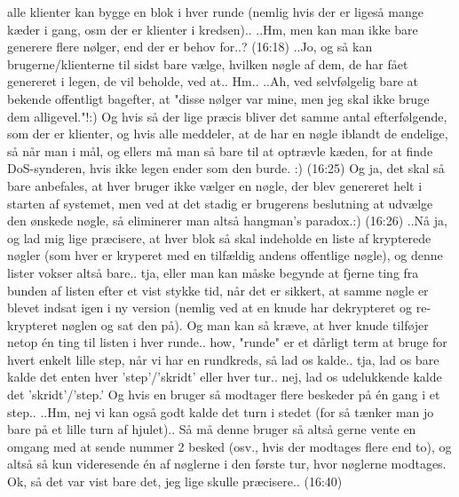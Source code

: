 \documentclass{report}
\begin{document}
alle klienter kan bygge en blok i hver runde (nemlig hvis der er ligeså mange kæder i gang, osm der er klienter i kredsen).. ..Hm, men kan man ikke bare generere flere nølger, end der er behov for..? (16:18) ..Jo, og så kan brugerne/klienterne til sidst bare vælge, hvilken nøgle af dem, de har fået genereret i legen, de vil beholde, ved at.. Hm.. ..Ah, ved selvfølgelig bare at bekende offentligt bagefter, at "disse nølger var mine, men jeg skal ikke bruge dem alligevel."!:) Og hvis så der lige præcis bliver det samme antal efterfølgende, som der er klienter, og hvis alle meddeler, at de har en nøgle iblandt de endelige, så når man i mål, og ellers må man så bare til at optrævle kæden, for at finde DoS-synderen, hvis ikke legen ender som den burde. :) (16:25) Og ja, det skal så bare anbefales, at hver bruger ikke vælger en nøgle, der blev genereret helt i starten af systemet, men ved at det stadig er brugerens beslutning at udvælge den ønskede nøgle, så eliminerer man altså hangman's paradox.:) (16:26) ..Nå ja, og lad mig lige præcisere, at hver blok så skal indeholde en liste af krypterede nøgler (som hver er kryperet med en tilfældig andens offentlige nøgle), og denne lister vokser altså bare.. tja, eller man kan måske begynde at fjerne ting fra bunden af listen efter et vist stykke tid, når det er sikkert, at samme nøgle er blevet indsat igen i ny version (nemlig ved at en knude har dekrypteret og re-krypteret nøglen og sat den på). Og man kan så kræve, at hver knude tilføjer netop én ting til listen i hver runde.. how, "runde" er et dårligt term at bruge for hvert enkelt lille step, når vi har en rundkreds, så lad os kalde.. tja, lad os bare kalde det enten hver 'step'/'skridt' eller hver tur.. nej, lad os udelukkende kalde det 'skridt'/'step.' Og hvis en bruger så modtager flere beskeder på én gang i et step.. ..Hm, nej vi kan også godt kalde det turn i stedet (for så tænker man jo bare på et lille turn af hjulet).. Så må denne bruger så altså gerne vente en omgang med at sende nummer 2 besked (osv., hvis der modtages flere end to), og altså så kun videresende én af nøglerne i den første tur, hvor nøglerne modtages. Ok, så det var vist bare det, jeg lige skulle præcisere.. (16:40)
%
\end{document}
